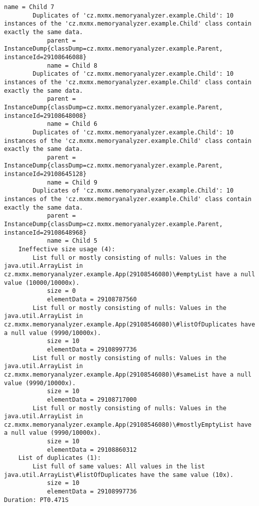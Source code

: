 \begin{minipage}{\linewidth}
\begin{lstlisting}[basicstyle=\tiny,columns=fullflexible,frame=single,breaklines=true,postbreak=\mbox{\textcolor{red}{$\hookrightarrow$}\space}]
            name = Child 7
        Duplicates of 'cz.mxmx.memoryanalyzer.example.Child': 10 instances of the 'cz.mxmx.memoryanalyzer.example.Child' class contain exactly the same data.
            parent = InstanceDump{classDump=cz.mxmx.memoryanalyzer.example.Parent, instanceId=29108646088}
            name = Child 8
        Duplicates of 'cz.mxmx.memoryanalyzer.example.Child': 10 instances of the 'cz.mxmx.memoryanalyzer.example.Child' class contain exactly the same data.
            parent = InstanceDump{classDump=cz.mxmx.memoryanalyzer.example.Parent, instanceId=29108648008}
            name = Child 6
        Duplicates of 'cz.mxmx.memoryanalyzer.example.Child': 10 instances of the 'cz.mxmx.memoryanalyzer.example.Child' class contain exactly the same data.
            parent = InstanceDump{classDump=cz.mxmx.memoryanalyzer.example.Parent, instanceId=29108645128}
            name = Child 9
        Duplicates of 'cz.mxmx.memoryanalyzer.example.Child': 10 instances of the 'cz.mxmx.memoryanalyzer.example.Child' class contain exactly the same data.
            parent = InstanceDump{classDump=cz.mxmx.memoryanalyzer.example.Parent, instanceId=29108648968}
            name = Child 5
    Ineffective size usage (4):
        List full or mostly consisting of nulls: Values in the java.util.ArrayList in cz.mxmx.memoryanalyzer.example.App(29108546080)\#emptyList have a null value (10000/10000x).
            size = 0
            elementData = 29108787560
        List full or mostly consisting of nulls: Values in the java.util.ArrayList in cz.mxmx.memoryanalyzer.example.App(29108546080)\#listOfDuplicates have a null value (9990/10000x).
            size = 10
            elementData = 29108997736
        List full or mostly consisting of nulls: Values in the java.util.ArrayList in cz.mxmx.memoryanalyzer.example.App(29108546080)\#sameList have a null value (9990/10000x).
            size = 10
            elementData = 29108717000
        List full or mostly consisting of nulls: Values in the java.util.ArrayList in cz.mxmx.memoryanalyzer.example.App(29108546080)\#mostlyEmptyList have a null value (9990/10000x).
            size = 10
            elementData = 29108860312
    List of duplicates (1):
        List full of same values: All values in the list java.util.ArrayList\#listOfDuplicates have the same value (10x).
            size = 10
            elementData = 29108997736
Duration: PT0.471S
\end{lstlisting}
\end{minipage}